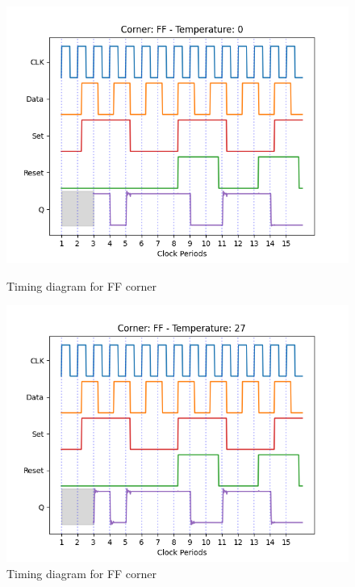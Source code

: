 \begin{figure}[H]
    \begin{minipage}{0.5\textwidth}
        \centering
        \includegraphics[width=\textwidth]{Figures/Aimspice_Plots/FF_0.png}
        \caption{Timing diagram for FF corner}
        \label{fig:FF0}
    \end{minipage}%
    \begin{minipage}{0.5\textwidth}
        \centering
        \includegraphics[width=\textwidth]{Figures/Aimspice_Plots/FF_27.png}
        \caption{Timing diagram for FF corner}
        \label{fig:FF27}
    \end{minipage}
\end{figure}
